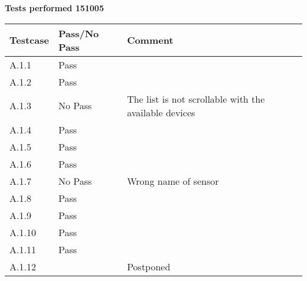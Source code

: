 \renewcommand{\testdate}{151005}
\textbf{ Tests performed \testdate}
\begin{center}
  		\begin{tabular}{| p{3cm} | p{5cm} | p{5cm} |}
    		\hline
	    	\textbf{Testcase}			& \textbf{Pass/No Pass} 	& \textbf{Comment} \\ \hline
    		A.1.1		 						& Pass 								&  \\\hline
    		A.1.2		 						& Pass 								& 				 \\	\hline
    		A.1.3		 						& No Pass 							& The list is not scrollable with the available devices		 \\	\hline
    		A.1.4		 						& Pass 								& 				 \\	\hline
    		A.1.5		 						& Pass 								& 				 \\	\hline
    		A.1.6		 						& Pass 								& 				 \\	\hline
    		A.1.7		 						& No Pass 							& Wrong name of sensor 				 \\	\hline
    		A.1.8		 						& Pass 								& 				 \\	\hline
    		A.1.9		 						& Pass 								& 				 \\	\hline
    		A.1.10	 							& Pass 								& 				 \\	\hline
    		A.1.11	 							& Pass 								& 				 \\	\hline
    		A.1.12	 							&  									& Postponed				 \\	\hline 		
 		 \end{tabular}
\end{center}
	